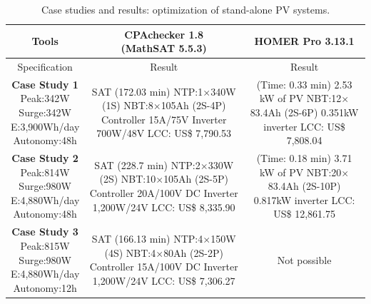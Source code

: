\documentclass[journal]{IEEEtran}
\begin{document}
\begin{table}[!t]
\caption{Case studies and results: optimization of stand-alone PV systems.}\label{tab1}
\begin{scriptsize}
\begin{tabular}{|c|c|c|}
\hline
\hline
Tools & \makecell{CPAchecker 1.8\\(MathSAT 5.5.3)}& HOMER Pro 3.13.1\\
\hline
\hline
Specification & Result & Result \\
\hline
\makecell{\textbf{Case Study 1}\\Peak:342W\\Surge:342W \\E:3,900Wh/day\\Autonomy:48h} & \makecell{SAT (172.03 min) \\NTP:1$\times$340W (1S)\\NBT:8$\times$105Ah (2S-4P)\\Controller 15A/75V\\Inverter 700W/48V\\LCC: US\$ 7,790.53} & \makecell{(Time: 0.33 min)\\2.53 kW of PV\\NBT:12$\times$83.4Ah (2S-6P)\\0.351kW inverter\\LCC: US\$ 7,808.04}\\
\hline
\makecell{\textbf{Case Study 2}\\Peak:814W\\Surge:980W\\E:4,880Wh/day\\Autonomy:48h} & \makecell {SAT (228.7 min) \\NTP:2$\times$330W (2S)\\NBT:10$\times$105Ah (2S-5P)\\Controller 20A/100V DC\\Inverter 1,200W/24V \\LCC: US\$ 8,335.90} & \makecell{(Time: 0.18 min)\\3.71 kW of PV\\NBT:20$\times$83.4Ah (2S-10P)\\0.817kW inverter\\LCC: US\$ 12,861.75} \\
\hline
\makecell{\textbf{Case Study 3}\\Peak:815W\\Surge:980W\\E:4,880Wh/day\\Autonomy:12h} & \makecell {SAT (166.13 min) \\NTP:4$\times$150W (4S)\\NBT:4$\times$80Ah (2S-2P)\\Controller 15A/100V DC\\Inverter 1,200W/24V \\LCC: US\$ 7,306.27} & Not possible \\

\end{tabular}
\end{scriptsize}
\end{table}
\end{document}
